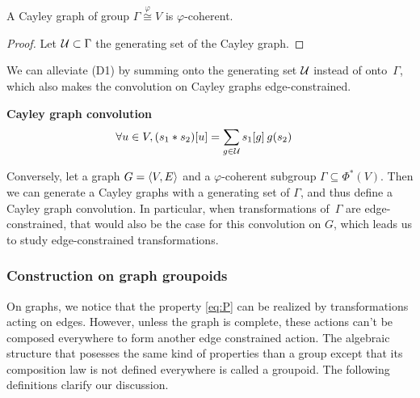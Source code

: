 \begin{proposition}
A Cayley graph of group $\Gamma \overset{\varphi}{\cong} V$ is $\varphi$-coherent.
\end{proposition}

\begin{proof}
Let $\cu \subset \Gamma$ the generating set of the Cayley graph.



\todo{}
\end{proof}

We can alleviate (D1) by summing onto the generating set $\cu$ instead of onto~$\Gamma$, which also makes the convolution on Cayley graphs edge-constrained.


\begin{definition}\textbf{Cayley graph convolution}\\
\begin{align*}
\forall u \in V, (s_1 \ast s_2) [u] & = \displaystyle \sum_{g \in \cu} s_1[g] \h{2} g(s_2)
\end{align*}
\end{definition}

Conversely, let a graph $\gve$ and a $\varphi$-coherent subgroup $\Gamma \subseteq \Phi^{*}(V)$. Then we can generate a Cayley graphs with a generating set of $\Gamma$, and thus define a Cayley graph convolution. In particular, when transformations of~$\Gamma$ are edge-constrained, that would also be the case for this convolution on $G$, which leads us to study edge-constrained transformations.


\subsubsection{Construction on graph groupoids}


On graphs, we notice that the property \eqref{eq:P} can be realized by transformations acting on edges. However, unless the graph is complete, these actions can't be composed everywhere to form another edge constrained action. The algebraic structure that posesses the same kind of properties than a group except that its composition law is not defined everywhere is called a groupoid. The following definitions clarify our discussion.

